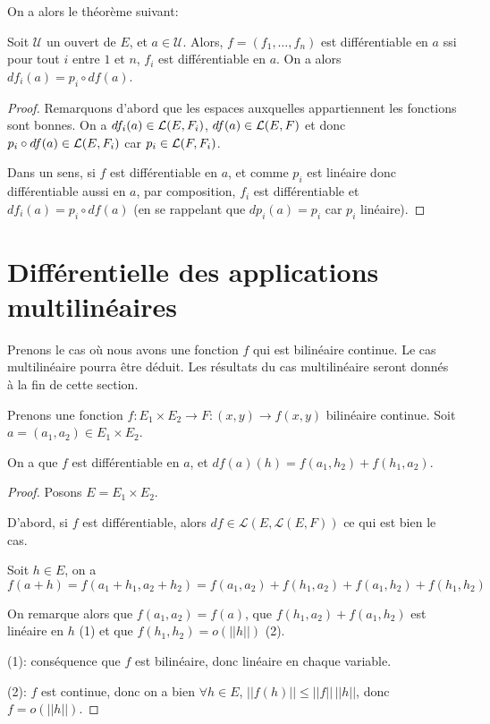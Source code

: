 On a alors le théorème suivant:

\begin{theorem}
\label{differential_composante}
	Soit $\mathcal{U}$ un ouvert de $E$, et $a \in \mathcal{U}$. Alors, 
	$f = (f_{1}, \ldots, f_{n})$ est différentiable en $a$ ssi pour tout $i$
	entre $1$ et $n$, $f_{i}$ est différentiable en $a$. On a alors $df_{i}(a) =
	p_{i} \circ df(a)$.
\end{theorem}

\begin{proof}
	Remarquons d'abord que les espaces auxquelles appartiennent les fonctions
	sont bonnes. On a $df_{i}(a) \in \mathcal{L}(E, F_{i})$, $df(a) \in
	\mathcal{L}(E, F)$ et donc $p_{i} \circ df(a) \in
	\mathcal{L}(E, F_{i})$ car $p_{i} \in
	\mathcal{L}(F, F_{i})$.

	Dans un sens, si $f$ est différentiable en $a$, et comme $p_{i}$ est
	linéaire donc différentiable aussi en $a$, par composition, $f_{i}$ est
	différentiable et $df_{i}(a) = p_{i} \circ df(a)$ (en se rappelant que
	$dp_{i}(a) = p_{i}$ car $p_{i}$ linéaire).
\end{proof}

\section{Différentielle des applications multilinéaires}

Prenons le cas où nous avons une fonction $f$ qui est bilinéaire continue. Le cas
multilinéaire pourra être déduit. Les résultats du cas multilinéaire seront
donnés à la fin de cette section.

\begin{proposition}
\label{bilinear_differential_application}
Prenons une fonction $f : E_{1} \times E_{2} \rightarrow F : (x, y) \rightarrow
f(x, y)$ bilinéaire continue. Soit $a = (a_{1}, a_{2}) \in E_{1} \times E_{2}$.

On a que $f$ est différentiable en $a$, et $df(a)(h) = f(a_{1}, h_{2}) +
f(h_{1}, a_{2})$.
\end{proposition}

\begin{proof}
	Posons $E = E_{1} \times E_{2}$.

	D'abord, si $f$ est différentiable, alors $df \in
	\mathcal{L}(E, \mathcal{L}(E, F))$ ce qui est bien
	le cas.

	Soit $h \in E$, on a
	$f(a + h) = f(a_{1} + h_{1}, a_{2} + h_{2}) = 
	f(a_{1}, a_{2}) + f(h_{1}, a_{2}) + f(a_{1}, h_{2}) + f(h_{1}, h_{2})$

	On remarque alors que $f(a_{1}, a_{2}) = f(a)$, que $f(h_{1}, a_{2}) +
	f(a_{1}, h_{2})$ est linéaire en $h$ (1) et que $f(h_{1}, h_{2}) = o(||h||)$
	(2).

	(1): conséquence que $f$ est bilinéaire, donc linéaire en chaque variable.

	(2): $f$ est continue, donc on a bien $\forall h \in E$, $||f(h)|| \leq
	||f|| \, ||h||$, donc $f = o(||h||)$.
\end{proof}


